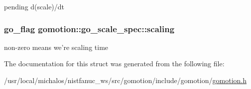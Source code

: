pending d(scale)/dt \hypertarget{structgomotion_1_1go__scale__spec_ab692a7752aa08649020c990b4bea3c84}{
\subsubsection[{scaling}]{\setlength{\rightskip}{0pt plus 5cm}go\-\_\-flag gomotion\-::go\-\_\-scale\-\_\-spec\-::scaling}}\label{structgomotion_1_1go__scale__spec_ab692a7752aa08649020c990b4bea3c84}
non-\/zero means we're scaling time 

The documentation for this struct was generated from the following file\-:\begin{DoxyCompactItemize}
\item 
/usr/local/michalos/nistfanuc\-\_\-ws/src/gomotion/include/gomotion/\hyperlink{gomotion_8h}{gomotion.\-h}\end{DoxyCompactItemize}
